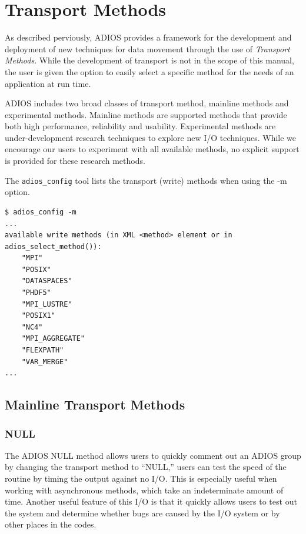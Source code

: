 \chapter{Transport Methods}
\label{chapter-methods}

As described perviously, ADIOS provides a framework for the development and
deployment of new techniques for data movement through the use of {\em
  Transport Methods}. While the development of transport is not in the scope of
this manual, the user is given the option to easily select a specific method for
the needs of an application at run time. 

ADIOS includes two broad classes of transport method, mainline methods and
experimental methods. Mainline methods are supported methods that provide both
high performance, reliability and usability. Experimental methods are
under-development research techniques to explore new I/O techniques. While we
encourage our users to experiment with all available methods, no explicit
support is provided for these research methods. 

The \verb+adios_config+ tool lists the transport (write) methods when using the -m option.

\begin{lstlisting}
$ adios_config -m
...
available write methods (in XML <method> element or in adios_select_method()):
    "MPI"
    "POSIX"
    "DATASPACES"
    "PHDF5"
    "MPI_LUSTRE"
    "POSIX1"
    "NC4"
    "MPI_AGGREGATE"
    "FLEXPATH"
    "VAR_MERGE"
...
\end{lstlisting}



\section{Mainline Transport Methods}

\subsection{NULL}

The ADIOS NULL method allows users to quickly comment out an ADIOS group by changing 
the transport method to ``NULL,'' users can test the speed of the routine by timing 
the output against no I/O. This is especially useful when working with asynchronous 
methods, which take an indeterminate amount of time.  Another useful feature of 
this I/O is that it quickly allows users to test out the system and determine whether 
bugs are caused by the I/O system or by other places in the codes.

